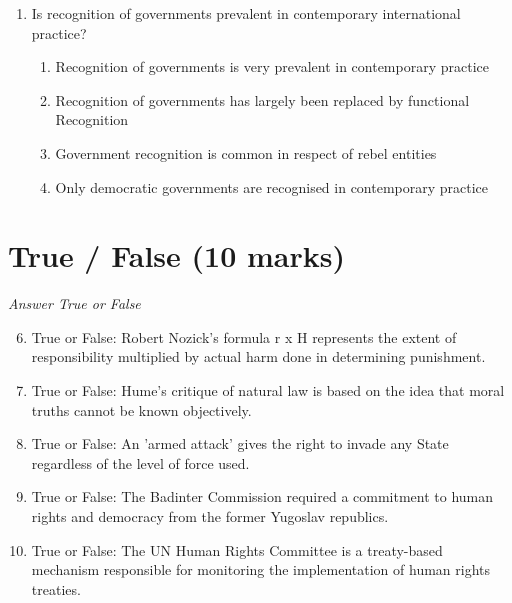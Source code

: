 \documentclass[12pt]{article}
\begin{document}
\begin{enumerate}[label=\arabic*.]
\begin{enumerate}[label=(\alph*)]
    \item Because it attempts to give effect to personal choice over individual luck.
    \item Because liberty is more important than equality.
    \item Because a market economy is just.
    \item Because the state is the best arbiter of equality between individuals.
\end{enumerate}
\item Is recognition of governments prevalent in contemporary international practice?
\begin{enumerate}[label=(\alph*)]
    \item Recognition of governments is very prevalent in contemporary practice
    \item Recognition of governments has largely been replaced by functional Recognition
    \item Government recognition is common in respect of rebel entities
    \item Only democratic governments are recognised in contemporary practice
\end{enumerate}
\end{enumerate}

\section*{True / False (10 marks)}
\textit{Answer True or False}
\begin{enumerate}[label=\arabic*.]
\setcounter{enumi}{5}
\item True or False: Robert Nozick's formula r x H represents the extent of responsibility multiplied by actual harm done in determining punishment.
\item True or False: Hume's critique of natural law is based on the idea that moral truths cannot be known objectively.
\item True or False: An 'armed attack' gives the right to invade any State regardless of the level of force used.
\item True or False: The Badinter Commission required a commitment to human rights and democracy from the former Yugoslav republics.
\item True or False: The UN Human Rights Committee is a treaty-based mechanism responsible for monitoring the implementation of human rights treaties.
\end{enumerate}
\end{document}
